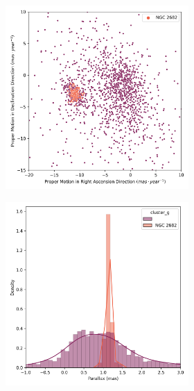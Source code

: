 \documentclass[11pt, a4paper, english]{book}
\begin{document}
\begin{figure}[H]
  \vfil
  \centering
  \begin{subfigure}{0.9\textwidth}
    \centering
    \begin{subfigure}[t]{0.30\textwidth}
      \centering
      \includegraphics[width=\textwidth]{../figures/ngc_2682/pm_ngc_2682.png}
    \end{subfigure}
    \hfill
    \begin{subfigure}[t]{0.30\textwidth}
      \centering
      \includegraphics[width=\textwidth]{../figures/ngc_2682/parallax_ngc_2682.png}

\end{subfigure}
\end{subfigure}
\end{figure}
\end{document}

